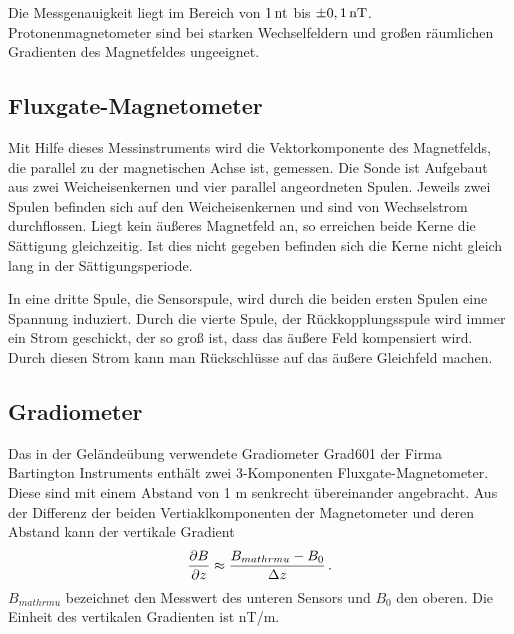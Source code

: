 Die Messgenauigkeit liegt im Bereich von $1\,\mathrm{nt}$ bis $\pm0,1\,\mathrm{nT}$. Protonenmagnetometer sind bei starken Wechselfeldern und großen räumlichen Gradienten des Magnetfeldes ungeeignet.

\subsection{Fluxgate-Magnetometer}
Mit Hilfe dieses Messinstruments wird die Vektorkomponente des Magnetfelds, die parallel zu der magnetischen Achse ist, gemessen.
Die Sonde ist Aufgebaut aus zwei Weicheisenkernen und vier parallel angeordneten Spulen. Jeweils zwei Spulen befinden sich auf den Weicheisenkernen und sind 
von Wechselstrom durchflossen. Liegt kein äußeres Magnetfeld an, so erreichen beide Kerne die Sättigung gleichzeitig. Ist dies nicht gegeben befinden sich 
die Kerne nicht gleich lang in der Sättigungsperiode.

In eine dritte Spule, die Sensorspule, wird durch die beiden ersten Spulen eine Spannung induziert. Durch die vierte Spule, der Rückkopplungsspule wird immer
ein Strom geschickt, der so groß ist, dass das äußere Feld kompensiert wird. Durch diesen Strom kann man Rückschlüsse auf das äußere Gleichfeld machen. 

\subsection{Gradiometer}
Das in der Geländeübung verwendete Gradiometer Grad601 der Firma Bartington Instruments enthält zwei 3-Komponenten Fluxgate-Magnetometer. Diese sind mit einem 
Abstand von 1 m senkrecht übereinander angebracht.
Aus der Differenz der beiden Vertiaklkomponenten der Magnetometer und deren Abstand kann der vertikale Gradient
\begin{equation}
 \frac{\partial B}{\partial z} \approx  \frac{B_{mathrm{u}}-B_0}{\Delta z} \text{\,.}
\end{equation}
$B_{mathrm{u}}$ bezeichnet den Messwert des unteren Sensors und $B_0$ den oberen. Die Einheit des vertikalen Gradienten ist nT/m.





